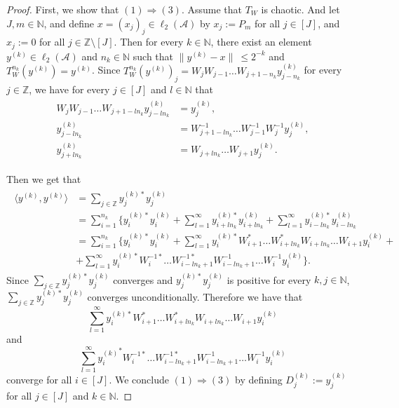 \documentclass{article}
\begin{document}
\begin{proof}
First, we show that $(1)\Rightarrow(3)$. Assume that $T_{W}$ is chaotic. And let $J,m\in\mathbb{N}$, and define $x=(x_{j})_{j}\in \ell_{2}{(\mathcal{A})}$ by $x_{j}:=P_{m}$ for all $j\in[J]$, and $x_{j}:=0$ for all $j\in{\mathbb{Z}\setminus[J]}$. Then for every $k\in \mathbb{N}$, there exist an element $y^{(k)}\in \ell_{2}{(\mathcal{A})}$ and $n_{k}\in\mathbb{N}$ such that $\|y^{(k)}-x\|\ \leq 2^{-k}$ and $T^{n_{k}}_{W}(y^{(k)})=y^{(k)}$.
Since  $T^{n_{k}}_{W}(y^{(k)})_{j}=W_{j}W_{j-1}\ldots W_{j+1-n_{k}}y^{(k)}_{j-n_{k}}$ for every $j\in\mathbb{Z}$, we have for every $j\in [J]$ and $l\in\mathbb{N}$ that
 \begin{eqnarray}\begin{split}\nonumber
 W_{j}W_{j-1}\ldots W_{j+1-ln_{k}}y^{(k)}_{j-ln_{k}}&=y^{(k)}_{j},\\
  y^{(k)}_{j-ln_{k}}&=W^{-1}_{j+1-ln_{k}}\ldots W^{-1}_{j-1}W^{-1}_{j}y^{(k)}_{j},\\
   y^{(k)}_{j+ln_{k}}&=W_{j+ln_{k}}\ldots W_{j+1}y^{(k)}_{j}.
 \end{split}\end{eqnarray}

Then we get that
\begin{eqnarray}\begin{split}\nonumber
\langle y^{(k)}, y^{(k)}\rangle &=\sum_{j\in\mathbb{Z}}{y^{(k){\ast}}_{j}}y^{(k)}_{j}\\
&=\sum^{n_{k}}_{i=1}\{{y^{(k){\ast}}_{i}}y^{(k)}_{i}+\sum^{\infty}_{l=1}{y^{(k){\ast}}_{i+ln_{k}}}y^{(k)}_{i+ln_{k}}+
\sum^{\infty}_{l=1}{y^{(k){\ast}}_{i-ln_{k}}}y^{(k)}_{i-ln_{k}}\\
&=\sum^{n_{k}}_{i=1}\{{y^{(k){\ast}}_{i}}y^{(k)}_{i}+\sum^{\infty}_{l=1}{y^{(k){\ast}}_{i}}{W^{\ast}_{i+1}}\ldots {W^{\ast}_{i+ln_{k}}}W_{i+ln_{k}}\ldots W_{i+1}y^{(k)}_{i}+\\
&+\sum^{\infty}_{l=1}{y^{(k){\ast}}_{i}}{W^{-1{\ast}}_{i}}\ldots {W^{-1{\ast}}_{i-ln_{k}+1}}W^{-1}_{i-ln_{k}+1}\ldots W^{-1}_{i}y^{(k)}_{i}\}.
\end{split}\end{eqnarray}
Since $\sum_{j\in\mathbb{Z}}{y^{(k){\ast}}_{j}}y^{(k)}_{j}$ converges and ${y^{(k){\ast}}_{j}}y^{(k)}_{j}$ is positive for every $k,j\in \mathbb{N}$,   
$\sum_{j\in\mathbb{Z}}{y^{(k){\ast}}_{j}}y^{(k)}_{j}$ converges unconditionally. Therefore we have that
\[\sum^{\infty}_{l=1}{y^{(k){\ast}}_{i}}{W^{\ast}_{i+1}}\ldots {W^{\ast}_{i+ln_{k}}}W_{i+ln_{k}}\ldots W_{i+1}y^{(k)}_{i}\]
and
\[\sum^{\infty}_{l=1}{y^{(k)}_{i}}^{\ast}{W^{-1{\ast}}_{i}}\ldots {W^{-1{\ast}}_{i-ln_{k}+1}}W^{-1}_{i-ln_{k}+1}\ldots W^{-1}_{i}y^{(k)}_{i}\]
 converge for all $i\in[J]$.
We conclude $(1)\Rightarrow(3)$ by defining $D^{(k)}_{j}:=y^{(k)}_{j}$ for all $j\in[J]$ and $k\in\mathbb{N}$.


\end{proof}
\end{document}
